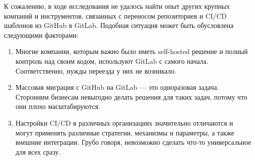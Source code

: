 К сожалению, в ходе исследования не удалось найти опыт других крупных компаний и инструментов, связанных с переносом репозиториев и CI/CD шаблонов из GitHub в GitLab.
Подобная ситуация может быть обусловлена следующими факторами:
\begin{enumerate}
  \item Многие компании, которым важно было иметь self-hosted решение и полный контроль над своим кодом, используют GitLab с самого начала.
        Соответственно, нужды переезда у них не возникало.

  \item Массовая миграция с GitHub на GitLab — это одноразовая задача.
        Сторонним бизнесам невыгодно делать решения для таких задач, потому что они плохо масштабируются.

  \item Настройки CI/CD в различных организациях значительно отличаются и могут применять различные стратегии,
        механизмы и параметры, а также внешние интеграции.
        Грубо говоря, невозможно сделать что-то универсальное для всех сразу.
\end{enumerate}
